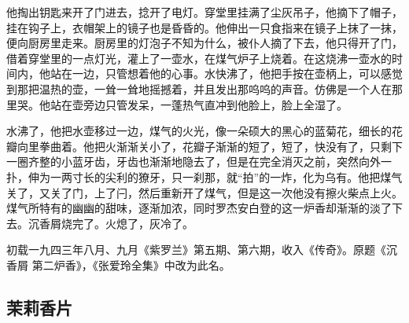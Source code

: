 \par 他掏出钥匙来开了门进去，捻开了电灯。穿堂里挂满了尘灰吊子，他摘下了帽子，挂在钩子上，衣帽架上的镜子也是昏昏的。他伸出一只食指来在镜子上抹了一抹，便向厨房里走来。厨房里的灯泡子不知为什么，被仆人摘了下去，他只得开了门，借着穿堂里的一点灯光，灌上了一壶水，在煤气炉子上烧着。在这烧沸一壶水的时间内，他站在一边，只管想着他的心事。水快沸了，他把手按在壶柄上，可以感觉到那把温热的壶，一耸一耸地摇撼着，并且发出那呜呜的声音。仿佛是一个人在那里哭。他站在壶旁边只管发呆，一蓬热气直冲到他脸上，脸上全湿了。
\par 水沸了，他把水壶移过一边，煤气的火光，像一朵硕大的黑心的蓝菊花，细长的花瓣向里拳曲着。他把火渐渐关小了，花瓣子渐渐的短了，短了，快没有了，只剩下一圈齐整的小蓝牙齿，牙齿也渐渐地隐去了，但是在完全消灭之前，突然向外一扑，伸为一两寸长的尖利的獠牙，只一刹那，就“拍”的一炸，化为乌有。他把煤气关了，又关了门，上了闩，然后重新开了煤气，但是这一次他没有擦火柴点上火。煤气所特有的幽幽的甜味，逐渐加浓，同时罗杰安白登的这一炉香却渐渐的淡了下去。沉香屑烧完了。火熄了，灰冷了。
\par {}
\par *初载一九四三年八月、九月《紫罗兰》第五期、第六期，收入《传奇》。原题《沉香屑 第二炉香》，《张爱玲全集》中改为此名。



\subsection{茉莉香片}

